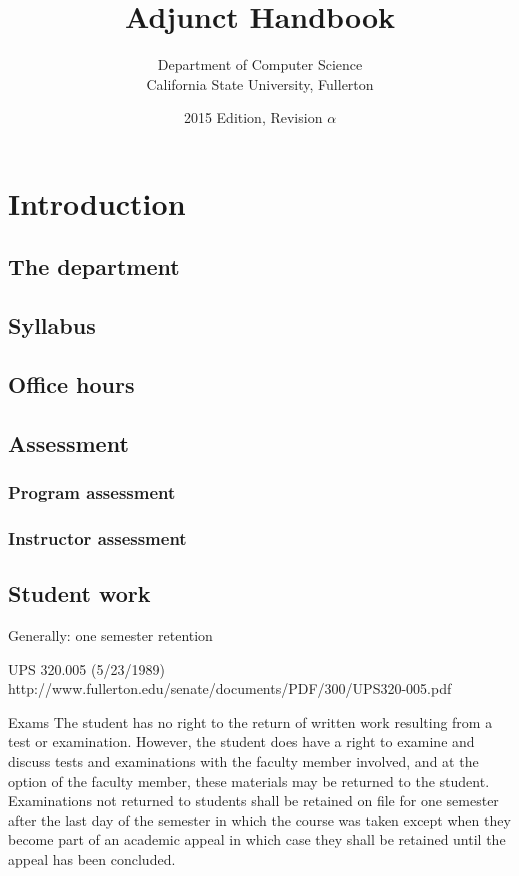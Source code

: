 \documentclass{book}
\begin{document}
\title{Adjunct Handbook}
\author{Department of Computer Science \\ California State University, Fullerton}
\date{2015 Edition, Revision $\alpha$}
\maketitle

\newpage
\tableofcontents

\chapter{Introduction}

\section{The department}

\section{Syllabus}

\section{Office hours}
\section{Assessment}
\subsection{Program assessment}
\subsection{Instructor assessment}

\section{Student work}
Generally: one semester retention

UPS 320.005 (5/23/1989)
http://www.fullerton.edu/senate/documents/PDF/300/UPS320-005.pdf

Exams
The student has no right to the return of written work resulting from a test or examination. However, the student does have a right to examine and discuss tests and examinations with the faculty member involved, and at the option of the faculty member, these materials may be returned to the student. Examinations not returned to students shall be retained on file for one semester after the last day of the semester in which the course was taken except when they become part of an academic appeal in which case they shall be retained until the appeal has been concluded.
\end{document}
